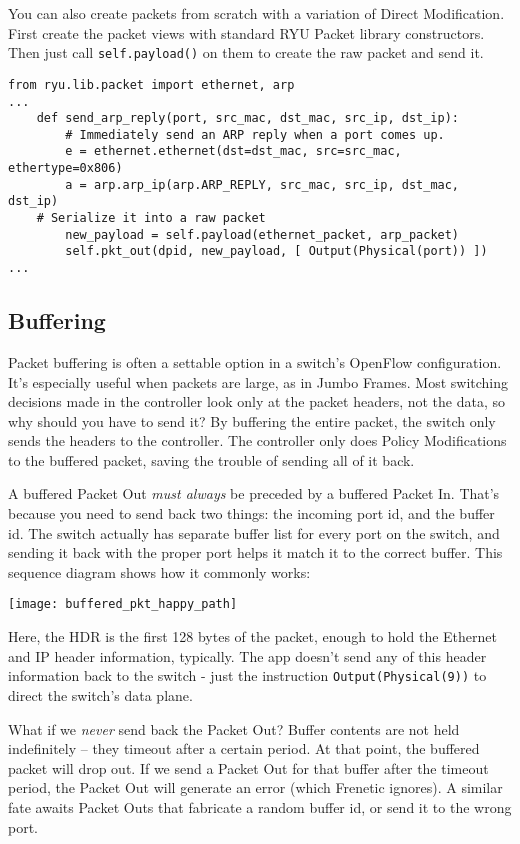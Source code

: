 You can also create packets from scratch with a variation of Direct Modification.  
First create the packet views with standard RYU Packet library constructors.
Then just call \texttt{self.payload()} on them to create the raw packet and send it.  

\begin{lstlisting}
from ryu.lib.packet import ethernet, arp
...
    def send_arp_reply(port, src_mac, dst_mac, src_ip, dst_ip):
        # Immediately send an ARP reply when a port comes up.
        e = ethernet.ethernet(dst=dst_mac, src=src_mac, ethertype=0x806)
        a = arp.arp_ip(arp.ARP_REPLY, src_mac, src_ip, dst_mac, dst_ip)
	# Serialize it into a raw packet
        new_payload = self.payload(ethernet_packet, arp_packet)
        self.pkt_out(dpid, new_payload, [ Output(Physical(port)) ])	
...
\end{lstlisting}

\subsection{Buffering}

Packet buffering is often a settable option in a switch's OpenFlow configuration.  It's 
especially useful when packets are large, as in Jumbo Frames.  Most switching decisions made in 
the controller look only at the packet headers, not the data, so why should you have to send it?  By buffering the
entire packet, the switch only sends the headers to the controller.  The controller only does Policy Modifications
to the buffered packet, saving the trouble of sending all of it back.  

A buffered Packet Out \emph{must always} be preceded by a buffered Packet In.  That's because you need 
to send back two things:
the incoming port id, and the buffer id.  The switch actually has separate buffer list for every port on the switch, and 
sending it back with the proper port helps it match it to the correct buffer.   
This sequence diagram shows how it commonly works:

\texttt{[image: buffered\_pkt\_happy\_path]}

Here, the HDR is the first 128 bytes of the packet, enough to hold the Ethernet and IP header information,
typically.  The app doesn't send any of this header information back to the switch - just the instruction
\texttt{Output(Physical(9))} to direct the switch's data plane.

What if we \emph{never} send back the Packet Out?  Buffer contents are not held indefinitely -- they timeout after a 
certain period.  At that point, the buffered packet will drop out.
If we send a Packet Out for that buffer after the timeout period, the Packet Out will generate an error (which
Frenetic ignores).    A similar fate awaits Packet Outs that fabricate a random buffer id, or send it to the
wrong port.  

